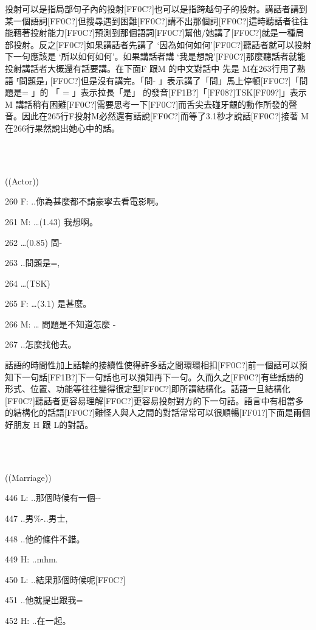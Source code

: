 投射可以是指局部句子內的投射[FF0C?]也可以是指跨越句子的投射。講話者講到某一個語詞[FF0C?]但搜尋遇到困難[FF0C?]講不出那個詞[FF0C?]這時聽話者往往能藉著投射能力[FF0C?]預測到那個語詞[FF0C?]幫他/她講了[FF0C?]就是一種局部投射。反之[FF0C?]如果講話者先講了 ‘因為如何如何’[FF0C?]聽話者就可以投射下一句應該是 ‘所以如何如何’。如果講話者講 ‘我是想說’[FF0C?]那麼聽話者就能投射講話者大概還有話要講。在下面F 跟M 的中文對話中 先是 M在263行用了熟語  ⸢問題是⸥ [FF0C?]但是沒有講完。「問- 」表示講了「問」馬上停頓[FF0C?]「問題是= 」的 「 = 」表示拉長「是」 的發音[FF1B?]「[FF08?]TSK[FF09?]」表示M 講話稍有困難[FF0C?]需要思考一下[FF0C?]而舌尖去碰牙齦的動作所發的聲音。因此在265行F投射M必然還有話說[FF0C?]而等了3.1秒才說話[FF0C?]接著 M 在266行果然說出她心中的話。

\ea%
\label{ex:key:2}
\gll\\
\\
\glt
\z

((Actor))

260  F:  ..你為甚麼都不請豪寧去看電影啊。

261  M:  …(1.43) 我想啊。           

262        …(0.85) 問-

263        ..問題是=,      

264        …(TSK)

265  F:  …(3.1) 是甚麼。

266  M:  … 問題是不知道怎麼 -

267         ..怎麼找他去。

話語的時間性加上話輪的接續性使得許多話之間環環相扣[FF0C?]前一個話可以預知下一句話[FF1B?]下一句話也可以預知再下一句。久而久之[FF0C?]有些話語的形式、位置、功能等往往變得很定型[FF0C?]即所謂結構化。話語一旦結構化[FF0C?]聽話者更容易理解[FF0C?]更容易投射對方的下一句話。語言中有相當多的結構化的話語[FF0C?]難怪人與人之間的對話常常可以很順暢[FF01?]下面是兩個好朋友 H 跟 L的對話。

\ea%
\label{ex:key:3}
\gll\\
\\
\glt
\z

((Marriage))

446  L:  ..那個時候有一個-{}-

447      ..男\%-..男士,

448      ..他的條件不錯。

449  H:  ..mhm.

450  L:  ..結果那個時候呢[FF0C?]

451     ..他就提出跟我=

452  H:  ..在一起。

